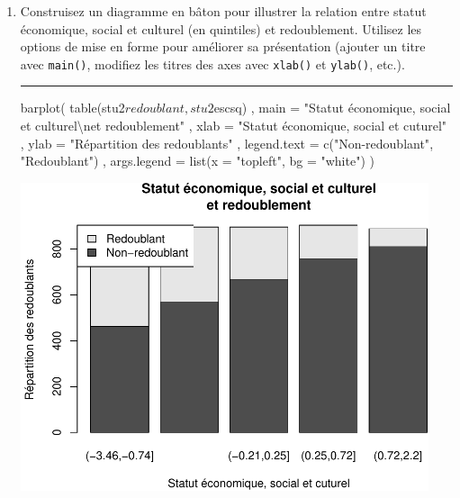 \documentclass[12pt,twosided, notitlepage]{book}
\newenvironment{Shaded}{}{}
\newcommand{\KeywordTok}[1]{\textcolor[rgb]{0.00,0.00,1.00}{#1}}
\newcommand{\DataTypeTok}[1]{#1}
\newcommand{\CharTok}[1]{\textcolor[rgb]{0.00,0.50,0.50}{#1}}
\newcommand{\StringTok}[1]{\textcolor[rgb]{0.00,0.50,0.50}{#1}}
\newcommand{\OperatorTok}[1]{#1}
\newcommand{\NormalTok}[1]{#1}
\newif \ifsol
\renewenvironment{Shaded}{\begin{snugshade}}{\end{snugshade}}
\begin{document}
\begin{enumerate}
\def\labelenumi{\alph{enumi}.}
\item
  Construisez un diagramme en bâton pour illustrer la relation entre
  statut économique, social et culturel (en quintiles) et redoublement.
  Utilisez les options de mise en forme pour améliorer sa présentation
  (ajouter un titre avec \texttt{main()}, modifiez les titres des axes
  avec \texttt{xlab()} et \texttt{ylab()},
  etc.).

  \ifsol 

  \begin{center} \rule{0.5\linewidth}{\linethickness}\end{center}

\begin{Shaded}
\begin{Highlighting}[]
\KeywordTok{barplot}\NormalTok{(}
  \KeywordTok{table}\NormalTok{(stu2}\OperatorTok{$}\NormalTok{redoublant, stu2}\OperatorTok{$}\NormalTok{escsq)}
\NormalTok{  , }\DataTypeTok{main =} \StringTok{"Statut économique, social et culturel}\CharTok{\textbackslash{}n}\StringTok{et redoublement"}
\NormalTok{  , }\DataTypeTok{xlab =} \StringTok{"Statut économique, social et cuturel"}
\NormalTok{  , }\DataTypeTok{ylab =} \StringTok{"Répartition des redoublants"}
\NormalTok{  , }\DataTypeTok{legend.text =} \KeywordTok{c}\NormalTok{(}\StringTok{"Non-redoublant"}\NormalTok{, }\StringTok{"Redoublant"}\NormalTok{)}
\NormalTok{  , }\DataTypeTok{args.legend =} \KeywordTok{list}\NormalTok{(}\DataTypeTok{x =} \StringTok{"topleft"}\NormalTok{, }\DataTypeTok{bg =} \StringTok{"white"}\NormalTok{)}
\NormalTok{)}
\end{Highlighting}
\end{Shaded}

  \begin{center}\includegraphics[width=12cm]{livret_files/figure-latex/unnamed-chunk-479-1} \end{center}


\end{enumerate}
\end{document}
